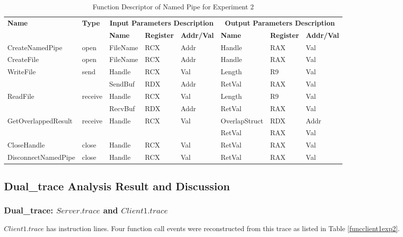 \begin{table}[H]
  \centering
  \caption{Function Descriptor of Named Pipe for Experiment 2}
  \label{fdescexp2}
\begin{tabular}{|l|l|l|l|l|l|l|l|}
\hline
             \multirow{2}{*}{{\textbf{Name}}} & \multirow{2}{*}{{\textbf{Type}}} & \multicolumn{3}{c|}{\textbf{Input Parameters Description}} & \multicolumn{3}{c|}{\textbf{Output Parameters Description}} \\
              \cline{3-8} 
             & & \textbf{Name}& \textbf{Register} & \textbf{Addr/Val} & \textbf{Name}& \textbf{Register} &  \textbf{Addr/Val}  \\
             \hline
      CreateNamedPipe
       &open & FileName & RCX  & Addr &  Handle & RAX & Val\\
      \hline         
      CreateFile
       &open & FileName & RCX & Addr&  Handle & RAX & Val\\ 
      \hline              
      \multirow{2}{*}{WriteFile}
       &\multirow{2}{*}{send} &  Handle & RCX & Val & Length & R9 & Val\\
        \cline{3-8} 
       & & SendBuf & RDX & Addr & RetVal& RAX & Val\\
      \hline            
      \multirow{2}{*}{ReadFile}
       &\multirow{2}{*}{receive} &  Handle & RCX & Val& Length & R9 & Val\\
        \cline{3-8} 
       & & RecvBuf & RDX  & Addr & RetVal& RAX & Val\\
      \hline    
           \multirow{2}{*}{GetOverlappedResult} &
       \multirow{2}{*}{receive} &  \multirow{2}{*}{Handle} & \multirow{2}{*}{RCX} & \multirow{2}{*}{Val} &OverlapStruct &RDX & Addr\\
               \cline{6-8} 
       & &  &   &  & RetVal& RAX & Val\\
      \hline     
      CloseHandle &
       close &  Handle & RCX & Val & RetVal& RAX & Val\\
      \hline            
      DisconnectNamedPipe &
      close &  Handle & RCX & Val & RetVal& RAX & Val\\
      \hline               
  \end{tabular}  
\end{table} 

\subsection{Dual\_trace Analysis Result  and Discussion}
\subsubsection{Dual\_trace: $Server.trace$ and $Client1.trace$}
$Client1.trace$ has instruction lines. Four function call events were reconstructed from this trace as listed in Table \ref{funcclient1exp2}.


